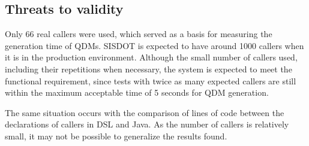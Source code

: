 \subsection{Threats to validity}


Only 66 real callers were used, which served as a basis for measuring the generation time of QDMs. SISDOT is expected to have around 1000 callers when it is in the production environment. Although the small number of callers used, including their repetitions when necessary, the system is expected to meet the functional requirement, since tests with twice as many expected callers are still within the maximum acceptable time of 5 seconds for QDM generation.


The same situation occurs with the comparison of lines of code between the declarations of callers in DSL and Java. As the number of callers is relatively small, it may not be possible to generalize the results found.

